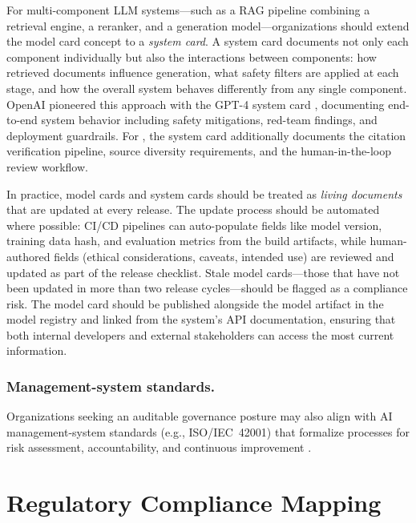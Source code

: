 For multi-component LLM systems---such as a RAG pipeline combining a retrieval engine, a reranker, and a generation model---organizations should extend the model card concept to a \emph{system card}. A system card documents not only each component individually but also the interactions between components: how retrieved documents influence generation, what safety filters are applied at each stage, and how the overall system behaves differently from any single component. OpenAI pioneered this approach with the GPT-4 system card \cite{nature2023}, documenting end-to-end system behavior including safety mitigations, red-team findings, and deployment guardrails. For \ishtar{}, the system card additionally documents the citation verification pipeline, source diversity requirements, and the human-in-the-loop review workflow.

In practice, model cards and system cards should be treated as \emph{living documents} that are updated at every release. The update process should be automated where possible: CI/CD pipelines can auto-populate fields like model version, training data hash, and evaluation metrics from the build artifacts, while human-authored fields (ethical considerations, caveats, intended use) are reviewed and updated as part of the release checklist. Stale model cards---those that have not been updated in more than two release cycles---should be flagged as a compliance risk. The model card should be published alongside the model artifact in the model registry and linked from the system's API documentation, ensuring that both internal developers and external stakeholders can access the most current information.

\subsubsection{Management-system standards.}
Organizations seeking an auditable governance posture may also align with AI management-system standards (e.g.,
ISO/IEC~42001) that formalize processes for risk assessment, accountability, and continuous improvement
\cite{iso_42001}.

\section{Regulatory Compliance Mapping}\label{sec:ethics-regulatory}

